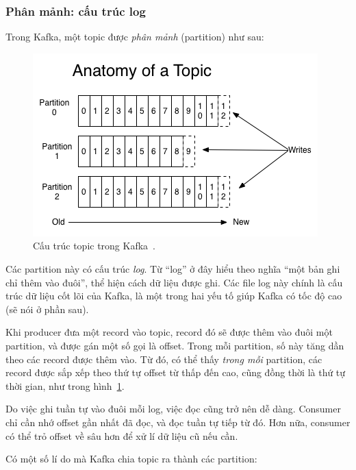 \documentclass{article}
\begin{document}
\subsubsection{Phân mảnh: cấu trúc log}

Trong Kafka, một topic được \emph{phân mảnh} (partition) như sau:

\begin{figure}[H]
    \includegraphics[scale=0.5]{log_anatomy.png}
    \centering
    \caption{Cấu trúc topic trong Kafka~\cite{kafka_intro}.}\label{log_anatomy}
\end{figure}

Các partition này có cấu trúc \emph{log}. Từ ``log'' ở đây hiểu theo nghĩa ``một
bản ghi chỉ thêm vào đuôi'', thể hiện cách dữ liệu được ghi. Các file log này
chính là cấu trúc dữ liệu cốt lõi của Kafka, là một trong hai yếu tố giúp Kafka
có tốc độ cao (sẽ nói ở phần sau).

Khi producer đưa một record vào topic, record đó sẽ được thêm vào đuôi một
partition, và được gán một số gọi là offset. Trong mỗi partition, số này tăng
dần theo các record được thêm vào. Từ đó, có thể thấy \emph{trong mỗi}
partition, các record được sắp xếp theo thứ tự offset từ thấp đến cao, cũng đồng
thời là thứ tự thời gian, như trong hình~\ref{log_anatomy}.

Do việc ghi tuần tự vào đuôi mỗi log, việc đọc cũng trở nên dễ dàng. Consumer
chỉ cần nhớ offset gần nhất đã đọc, và đọc tuần tự tiếp từ đó. Hơn nữa, consumer
có thể trỏ offset về sâu hơn để xử lí dữ liệu cũ nếu cần.

Có một số lí do mà Kafka chia topic ra thành các partition:
\end{document}
